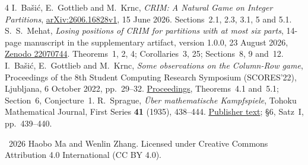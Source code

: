 \documentclass[11pt]{article}
\begin{document}
\begin{thebibliography}{4}
I.~Ba\v{s}i\'c, E.~Gottlieb and M.~Krnc,
\emph{CRIM: A Natural Game on Integer Partitions},
\href{https://arxiv.org/abs/2606.16828v1}{arXiv:2606.16828v1}, 15 June 2026.
Sections~2.1, 2.3, 3.1, 5 and 5.1.
S.~S.~Mehat,
\emph{Losing positions of CRIM for partitions with at most six parts},
14-page manuscript in the supplementary artifact, version 1.0.0,
23 August 2026, \href{https://doi.org/10.5281/zenodo.22070744}{Zenodo 22070744}.
Theorems~1, 2, 4; Corollaries~3, 25; Sections~8, 9 and~12.
I.~Ba\v{s}i\'c, E.~Gottlieb and M.~Krnc,
\emph{Some observations on the Column-Row game},
Proceedings of the 8th Student Computing Research Symposium (SCORES'22),
Ljubljana, 6 October 2022, pp.~29--32.
\href{https://zalozba.fri.uni-lj.si/SCORES2022.pdf}{Proceedings},
Theorems~4.1 and~5.1; Section~6, Conjecture~1.
R.~Sprague,
\emph{\"Uber mathematische Kampfspiele},
Tohoku Mathematical Journal, First Series \textbf{41} (1935), 438--444.
\href{https://www.jstage.jst.go.jp/article/tmj1911/41/0/41_0_438/_article}{Publisher text};
\S6, Satz~I, pp.~439--440.
\end{thebibliography}
\bigskip
\noindent\small\textcopyright\ 2026 Haobo Ma and Wenlin Zhang.
Licensed under Creative Commons Attribution 4.0 International
(CC BY 4.0).
\end{document}
